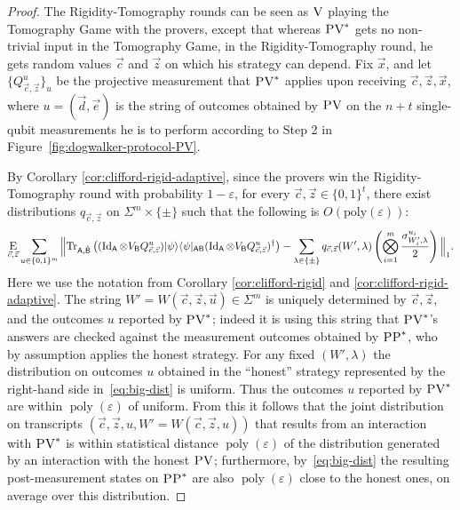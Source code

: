 \documentclass[11pt,letter]{article}
\theoremstyle{remark}
\theoremstyle{definition}
\newcommand{\ket}[1]{|#1\rangle}
\newcommand{\bra}[1]{\langle#1|}
\newcommand{\Tr}{\mbox{\rm Tr}}
\newcommand{\Id}{\ensuremath{\mathop{\rm Id}\nolimits}}
\newcommand{\Es}[1]{\ensuremath{\mathop{\textsc{E}}}_{#1}}
\DeclareMathOperator{\poly}{poly}
\newcommand{\reg}[1]{{\textsf{#1}}}
\newcommand{\eps}{\varepsilon}
\newcommand{\ver}{\textsc{V}}
\newcommand{\pv}{\textsc{PV}}
\newcommand{\pp}{\textsc{PP}}
\begin{document}
\begin{proof}
The Rigidity-Tomography rounds can be seen as $\ver$ playing the Tomography Game
  with the provers, except that whereas $\pv^*$ gets no non-trivial input in the
  Tomography Game, in the Rigidity-Tomography round, he gets random values
  $\vec{c}$ and $\vec{z}$ on which his strategy can depend. Fix $\vec{x}$, and let
  $\{Q_{\vec{c},\vec{z}}^{u}\}_{u}$ be the projective measurement that $\pv^*$
  applies upon receiving $\vec{c},\vec{z},\vec{x}$, where  $u = (\vec{d},\vec{e})$ is
  the string of outcomes obtained by $\pv$ on the $n+t$ single-qubit
  measurements he is to perform according to Step 2 in
  Figure~\ref{fig:dogwalker-protocol-PV}. 

By Corollary \ref{cor:clifford-rigid-adaptive}, since the provers win the Rigidity-Tomography round with probability $1-\eps$, for every $\vec{c},\vec{z}\in\{0,1\}^t$,
there exist distributions $q_{\vec{c},\vec{z}}$ on $\Sigma^m\times\{\pm\}$ such that the following is $O(\mathrm{poly}(\eps))$:
\begin{equation}\label{eq:big-dist}
\Es{\vec{c},\vec{z}}\sum_{ u\in \{0, 1\}^m}
\Big\| \Tr_{\reg{A},\hat{\reg{B}}}\left((\Id_{\reg{A}}\otimes V_{\reg{B}} Q_{\vec{c},\vec{z}}^{u})\ket{\psi}\bra{\psi}_{\reg{AB}}(\Id_{\reg{A}}\otimes V_{\reg{B}} Q_{\vec{c},\vec{z}}^{u})^\dagger\right)
- \sum_{\lambda\in\{\pm\}}q_{\vec{c},\vec{z}}(W',\lambda)\left(\bigotimes_{i=1}^m \frac{\sigma^{u_i}_{W_i',\lambda}}{2}\right)\Big\|_1. 
\end{equation}
Here we use the notation from Corollary \ref{cor:clifford-rigid} and
  \ref{cor:clifford-rigid-adaptive}. The string
  $W'=W(\vec{c},\vec{z},\vec{u})\in\Sigma^m$ is uniquely determined by
  $\vec{c},\vec{z}$, and the outcomes ${u}$ reported by $\pv^*$; indeed it
  is using this string that $\pv^*$'s answers are checked against the
  measurement outcomes obtained by $\pp^*$, who by assumption applies the
  honest strategy. For any fixed $(W',\lambda)$ the distribution on
  outcomes $u$ obtained in the ``honest'' strategy represented by the right-hand
  side in~\eqref{eq:big-dist} is uniform. Thus the outcomes $u$ reported by
  $\pv^*$ are within $\poly(\eps)$ of uniform. From this it follows that the joint distribution on transcripts $(\vec{c},\vec{z},u,W'=W(\vec{c},\vec{z},u))$ that results from an interaction with $\pv^*$ is within statistical distance $\poly(\eps)$ of the distribution generated by an interaction with the honest $\pv$; furthermore, by~\eqref{eq:big-dist} the resulting post-measurement states on $\pp^*$ are also $\poly(\eps)$ close to the honest ones, on average over this distribution. 


\end{proof}
\end{document}
